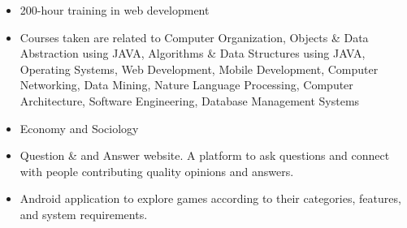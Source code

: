 \documentclass[10pt,a4paper,ragged2e,withhyper]{altacv}
\begin{document}
\begin{paracol}{2}
            \begin{itemize}
                \item 200-hour training in web development 
            \end{itemize}
        
            \begin{itemize}
                \item Courses taken are related to Computer Organization, Objects \& Data Abstraction using JAVA, Algorithms \& Data Structures using JAVA, Operating Systems, Web Development, Mobile Development, Computer Networking, Data Mining, Nature Language Processing, Computer Architecture, Software Engineering, Database Management Systems
            \end{itemize}
            \divider
            
            \begin{itemize}
                \item Economy and Sociology
            \end{itemize}
        
            \begin{itemize}
                \item Question \& and Answer website. A platform to ask questions and connect with people contributing quality opinions and answers.
            \end{itemize}
            \divider
            
            \begin{itemize}
                \item Android application to explore games according to their categories, features, and system requirements.
            \end{itemize}
    \end{paracol}
\end{document}
